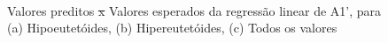\documentclass[brazil,tf,epusp]{usp}  %
\providecommand{\DIFadd}[1]{{\protect\color{blue}\uwave{#1}}} %
\providecommand{\DIFdel}[1]{{\protect\color{red}\sout{#1}}}                      %
\providecommand{\DIFaddFL}[1]{\DIFadd{#1}} %
\providecommand{\DIFdelFL}[1]{\DIFdel{#1}} %
\providecommand{\DIFaddbeginFL}{} %
\providecommand{\DIFaddendFL}{} %
\providecommand{\DIFdelbeginFL}{} %
\providecommand{\DIFdelendFL}{} %
\begin{document}
\begin{figure}[!h]
\hfill
{}\\
\caption{Valores preditos \DIFdelbeginFL \DIFdelFL{x }\DIFdelendFL \DIFaddbeginFL \DIFaddFL{vs. }\DIFaddendFL Valores esperados da regressão linear de A1', para (a) Hipoeutetóides, (b) Hipereutetóides, (c) Todos os valores}
\label{fig:LR_A1prime}
\end{figure}
\end{document}
